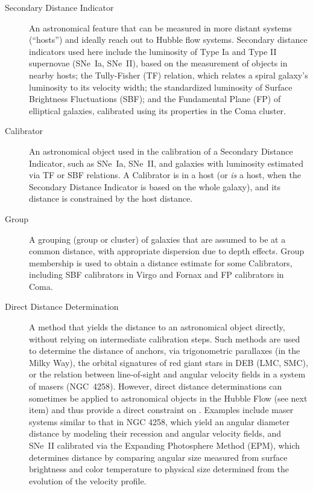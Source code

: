\begin {description}
\item [Secondary Distance Indicator] An astronomical feature that can be measured in more distant systems (``hosts'') and ideally reach out to Hubble flow systems.  Secondary distance indicators used here include the luminosity of Type Ia and Type II supernovae (SNe~Ia, SNe~II), based on the measurement of objects in nearby hosts; the Tully-Fisher (TF) relation, which relates a spiral galaxy's luminosity to its velocity width; the standardized luminosity of Surface Brightness Fluctuations (SBF); and the Fundamental Plane (FP) of elliptical galaxies, calibrated using its properties in the Coma cluster. 

\item [Calibrator] An astronomical object used in the calibration of a Secondary Distance Indicator, such as SNe~Ia, SNe~II, and galaxies with luminosity estimated via TF or SBF relations.  A Calibrator is in a host (or \textit{is} a host, when the Secondary Distance Indicator is based on the whole galaxy), and its distance is constrained by the host distance.

\item [Group] A grouping (group or cluster) of galaxies that are assumed to be at a common distance, with appropriate dispersion due to depth effects.  Group membership is used to obtain a distance estimate for some Calibrators, including SBF calibrators in Virgo and Fornax and FP calibrators in Coma.

\item [Direct Distance Determination] A method that yields the distance to an astronomical object directly, without relying on intermediate calibration steps.  Such methods are used to determine the distance of anchors, via trigonometric parallaxes (in the Milky Way), the orbital signatures of red giant stars in DEB (LMC, SMC), or the relation between line-of-sight and angular velocity fields in a system of masers (NGC~4258). However, direct distance determinations can sometimes be applied to astronomical objects in the Hubble Flow (see next item) and thus provide a direct constraint on {\Hcst}. Examples include maser systems similar to that in NGC 4258, which yield an angular diameter distance by modeling their recession and angular velocity fields, and SNe~II calibrated via the Expanding Photosphere Method (EPM), which determines distance by comparing angular size measured from surface brightness and color temperature to physical size determined from the evolution of the velocity profile. 


\end{description}
